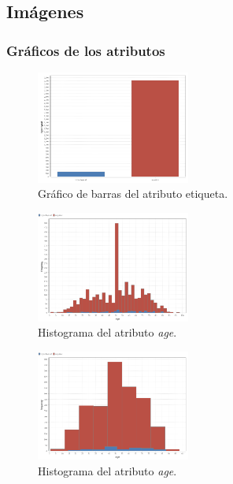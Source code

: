 \documentclass[osajnl,twocolumn,showpacs,superscriptaddress,10pt,floatfix]{revtex4-1} %
\begin{document}
\subsection{Imágenes} \label{apendix:images}

\subsubsection{Gráficos de los atributos} \label{apendix:images:attr}

\twocolumngrid

\begin{figure}[H]
    \centering
    \includegraphics[width=0.45\textwidth]{analysis/bars_hypothyroid}
    \caption{Gráfico de barras del atributo etiqueta.}
    \label{figure:bars_hypothyroid}
\end{figure}

\begin{figure}[H]
    \centering
    \includegraphics[width=0.45\textwidth]{analysis/histogram_age}
    \caption{Histograma del atributo \textit{age}.}
    \label{figure:histogram_age}
\end{figure}

\begin{figure}[H]
    \centering
    \includegraphics[width=0.45\textwidth]{analysis/histogram_age2}
    \caption{Histograma del atributo \textit{age}.}
    \label{figure:histogram_age2}
\end{figure}
\end{document}
